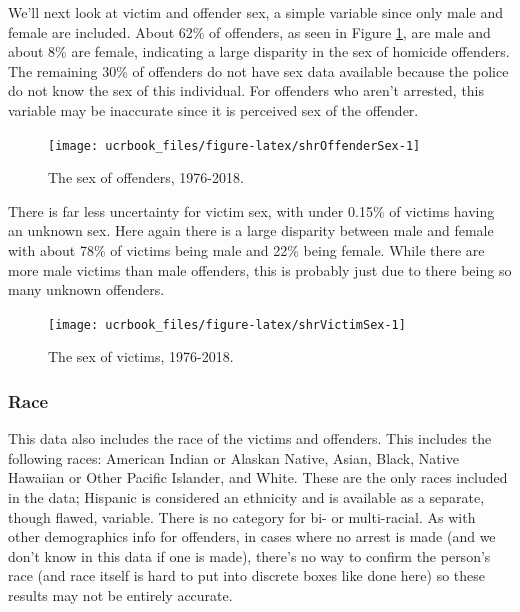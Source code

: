 \documentclass[
  12pt,
  openany]{book}
\begin{document}
We'll next look at victim and offender sex, a simple variable since only male and female are included. About 62\% of offenders, as seen in Figure \ref{fig:shrOffenderSex}, are male and about 8\% are female, indicating a large disparity in the sex of homicide offenders. The remaining 30\% of offenders do not have sex data available because the police do not know the sex of this individual. For offenders who aren't arrested, this variable may be inaccurate since it is perceived sex of the offender.

\begin{figure}

{\centering \texttt{[image: ucrbook\_files/figure-latex/shrOffenderSex-1]} 

}

\caption{The sex of offenders, 1976-2018.}\label{fig:shrOffenderSex}
\end{figure}

There is far less uncertainty for victim sex, with under 0.15\% of victims having an unknown sex. Here again there is a large disparity between male and female with about 78\% of victims being male and 22\% being female. While there are more male victims than male offenders, this is probably just due to there being so many unknown offenders.

\begin{figure}

{\centering \texttt{[image: ucrbook\_files/figure-latex/shrVictimSex-1]} 

}

\caption{The sex of victims, 1976-2018.}\label{fig:shrVictimSex}
\end{figure}

\hypertarget{race-1}{%
\subsubsection{Race}\label{race-1}}

This data also includes the race of the victims and offenders. This includes the following races: American Indian or Alaskan Native, Asian, Black, Native Hawaiian or Other Pacific Islander, and White. These are the only races included in the data; Hispanic is considered an ethnicity and is available as a separate, though flawed, variable. There is no category for bi- or multi-racial. As with other demographics info for offenders, in cases where no arrest is made (and we don't know in this data if one is made), there's no way to confirm the person's race (and race itself is hard to put into discrete boxes like done here) so these results may not be entirely accurate.
\end{document}
